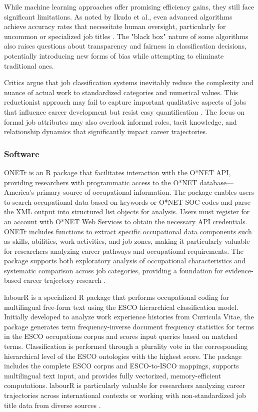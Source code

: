 \documentclass[../main.tex]{subfiles}
\begin{document}
While machine learning approaches offer promising efficiency gains, they still face significant limitations. As noted by Ikudo et al., even advanced algorithms achieve accuracy rates that necessitate human oversight, particularly for uncommon or specialized job titles \cite{ikudo2018}. The "black box" nature of some algorithms also raises questions about transparency and fairness in classification decisions, potentially introducing new forms of bias while attempting to eliminate traditional ones.

Critics argue that job classification systems inevitably reduce the complexity and nuance of actual work to standardized categories and numerical values. This reductionist approach may fail to capture important qualitative aspects of jobs that influence career development but resist easy quantification \cite{jeesr2021}. The focus on formal job attributes may also overlook informal roles, tacit knowledge, and relationship dynamics that significantly impact career trajectories.

\subsubsection{Software}

ONETr is an R package that facilitates interaction with the O*NET API, providing researchers with programmatic access to the O*NET database—America's primary source of occupational information. The package enables users to search occupational data based on keywords or O*NET-SOC codes and parse the XML output into structured list objects for analysis. Users must register for an account with O*NET Web Services to obtain the necessary API credentials. ONETr includes functions to extract specific occupational data components such as skills, abilities, work activities, and job zones, making it particularly valuable for researchers analyzing career pathways and occupational requirements. The package supports both exploratory analysis of occupational characteristics and systematic comparison across job categories, providing a foundation for evidence-based career trajectory research \cite{onetr2024}.

labourR is a specialized R package that performs occupational coding for multilingual free-form text using the ESCO hierarchical classification model. Initially developed to analyze work experience histories from Curricula Vitae, the package generates term frequency-inverse document frequency statistics for terms in the ESCO occupations corpus and scores input queries based on matched terms. Classification is performed through a plurality vote in the corresponding hierarchical level of the ESCO ontologies with the highest score. The package includes the complete ESCO corpus and ESCO-to-ISCO mappings, supports multilingual text input, and provides fully vectorized, memory-efficient computations. labourR is particularly valuable for researchers analyzing career trajectories across international contexts or working with non-standardized job title data from diverse sources \cite{labourr2024}.
\end{document}
